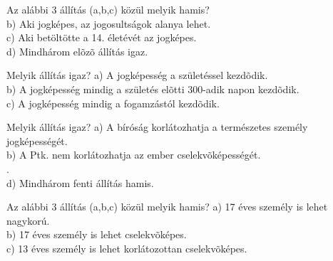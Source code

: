 \begin{frame}  

\begin{tcolorbox}[title={40. Kérdés}]
Az alábbi 3 állítás (a,b,c) közül melyik hamis?
\tcblower
{}\\
b) Aki jogképes, az jogosultságok alanya lehet.\\
c) Aki betöltötte a 14. életévét az jogképes.\\
d) Mindhárom elõzõ állítás igaz.
\end{tcolorbox}

\begin{tcolorbox}[title={41. Kérdés}]
Melyik állítás igaz?
\tcblower
a) A jogképesség a születéssel kezdõdik.\\
b) A jogképesség mindig a születés elõtti 300-adik napon kezdõdik.\\
c) A jogképesség mindig a fogamzástól kezdõdik.\\
\end{tcolorbox}

\begin{tcolorbox}[title={42. Kérdés}]
Melyik állítás igaz?
a) A bíróság korlátozhatja a természetes személy jogképességét.\\
b) A Ptk. nem korlátozhatja az ember cselekvõképességét.\\
.\\
d) Mindhárom fenti állítás hamis.
\end{tcolorbox}

\begin{tcolorbox}[title={43. Kérdés}]
Az alábbi 3 állítás (a,b,c) közül melyik hamis?
\tcblower
a) 17 éves személy is lehet nagykorú.\\
b) 17 éves személy is lehet cselekvõképes.\\
c) 13 éves személy is lehet korlátozottan cselekvõképes.\\
\end{tcolorbox}

\end{frame}


